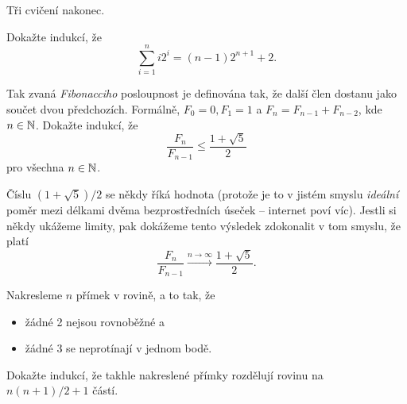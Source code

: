 Tři cvičení nakonec.
\newpage
\begin{exercise}
 Dokažte indukcí, že
 \[
  \sum_{i=1}^{n} i 2^{i} = (n - 1)2^{n+1} + 2.
 \]
\end{exercise}

\begin{exercise}
 Tak zvaná \emph{Fibonacciho} posloupnost je definována tak, že další člen
 dostanu jako součet dvou předchozích. Formálně, $F_0 = 0, F_1 = 1$ a $F_n =
 F_{n - 1} + F_{n - 2}$, kde $n \in \mathbb{N}$. Dokažte indukcí, že
 \[
  \frac{F_n}{F_{n-1}} \leq \frac{1+\sqrt{5}}{2}
 \]
 pro všechna $n \in \mathbb{N}$.

 Číslu  $(1+\sqrt{5}) / 2$ se někdy říká hodnota  (protože je
 to v jistém smyslu \emph{ideální} poměr mezi délkami dvěma bezprostředních
 úseček -- internet poví víc). Jestli si někdy ukážeme limity, pak dokážeme
 tento výsledek zdokonalit v tom smyslu, že platí
 \[
  \frac{F_n}{F_{n-1}} \xrightarrow{n \to \infty} \frac{1+\sqrt{5}}{2}. 
 \]
\end{exercise}

\begin{exercise}
 Nakresleme $n$ přímek v rovině, a to tak, že
 \begin{itemize}
  \item žádné 2 nejsou rovnoběžné a
  \item žádné 3 se neprotínají v jednom bodě.
 \end{itemize}
 Dokažte indukcí, že takhle nakreslené přímky rozdělují rovinu na $n(n+1) / 2 +
 1$ částí.
\end{exercise}
